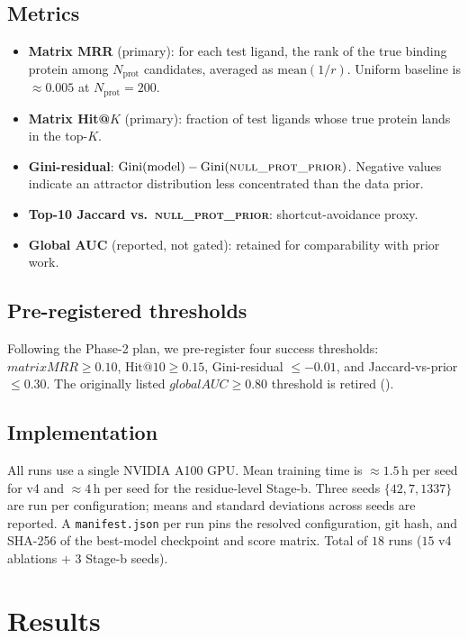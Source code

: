 \documentclass[11pt,a4paper]{article}
\newcommand{\nullprior}{\textsc{null\_prot\_prior}\xspace}
\newcommand{\gauc}{global AUC}
\newcommand{\matmrr}{matrix MRR}
\begin{document}
\subsection{Metrics}
\begin{itemize}[leftmargin=*,itemsep=0pt,topsep=1pt]
  \item \textbf{Matrix MRR} (primary): for each test ligand, the rank of
        the true binding protein among $N_{\text{prot}}$ candidates,
        averaged as $\mathrm{mean}(1/r)$. Uniform baseline is
        $\approx 0.005$ at $N_{\text{prot}} = 200$.
  \item \textbf{Matrix Hit@$K$} (primary): fraction of test ligands
        whose true protein lands in the top-$K$.
  \item \textbf{Gini-residual}: $\mathrm{Gini}(\text{model}) -
        \mathrm{Gini}(\nullprior)$. Negative values indicate an
        attractor distribution less concentrated than the data prior.
  \item \textbf{Top-10 Jaccard vs.\ \nullprior}: shortcut-avoidance
        proxy.
  \item \textbf{Global AUC} (reported, not gated): retained for
        comparability with prior work.
\end{itemize}

\subsection{Pre-registered thresholds}
Following the Phase-2 plan, we pre-register four success thresholds:
$\matmrr \geq 0.10$, $\text{Hit@10} \geq 0.15$, Gini-residual
$\leq -0.01$, and Jaccard-vs-prior $\leq 0.30$. The originally listed
$\gauc \geq 0.80$ threshold is retired ().

\subsection{Implementation}
All runs use a single NVIDIA A100 GPU. Mean training time is
$\approx\!1.5$\,h per seed for v4 and $\approx\!4$\,h per seed for the
residue-level Stage-b. Three seeds $\{42, 7, 1337\}$ are run per
configuration; means and standard deviations across seeds are reported.
A \texttt{manifest.json} per run pins the resolved configuration, git
hash, and SHA-256 of the best-model checkpoint and score matrix. Total
of $18$ runs ($15$ v4 ablations $+$ $3$ Stage-b seeds).

\section{Results}
\label{sec:results}
\end{document}
